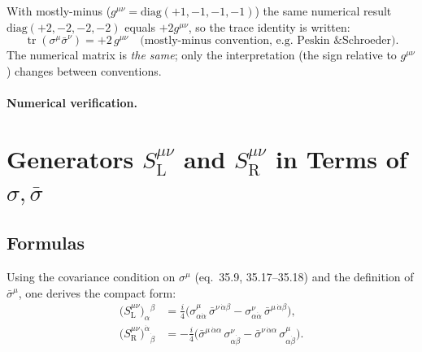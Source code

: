 \begin{metricnote}
With mostly-minus ($g^{\mu\nu}=\mathrm{diag}(+1,-1,-1,-1)$) the same
numerical result $\mathrm{diag}(+2,-2,-2,-2)$ equals $+2g^{\mu\nu}$,
so the trace identity is written:
\[
  \operatorname{tr}(\sigma^\mu\bar\sigma^\nu) = +2\,g^{\mu\nu}
  \quad\text{(mostly-minus convention, e.g.\ Peskin \& Schroeder).}
\]
The numerical matrix is \emph{the same}; only the interpretation (the
sign relative to $g^{\mu\nu}$) changes between conventions.
\end{metricnote}

\paragraph{Numerical verification.}


\section{Generators \texorpdfstring{$S^{\mu\nu}_{\mathrm{L}}$}{S\_L} and
         \texorpdfstring{$S^{\mu\nu}_{\mathrm{R}}$}{S\_R}
         in Terms of \texorpdfstring{$\sigma,\bar\sigma$}{sigma,sigmabar}
         \quad [eq.~35.21--35.22]}

\subsection{Formulas}

Using the covariance condition on $\sigma^\mu$ (eq.~35.9, 35.17--35.18)
and the definition of $\bar\sigma^\mu$, one derives the compact form:
\begin{align}
  \bigl(S^{\mu\nu}_{\mathrm{L}}\bigr)_\alpha{}^\beta
  &= \tfrac{i}{4}
    \bigl(\sigma^\mu_{\alpha\dot\alpha}\,\bar\sigma^{\nu\,\dot\alpha\beta}
         -\sigma^\nu_{\alpha\dot\alpha}\,\bar\sigma^{\mu\,\dot\alpha\beta}\bigr),
  \tag{35.21}\\[6pt]
  \bigl(S^{\mu\nu}_{\mathrm{R}}\bigr)^{\dot\alpha}{}_{\dot\beta}
  &= -\tfrac{i}{4}
    \bigl(\bar\sigma^{\mu\,\dot\alpha\alpha}\,\sigma^\nu_{\alpha\dot\beta}
         -\bar\sigma^{\nu\,\dot\alpha\alpha}\,\sigma^\mu_{\alpha\dot\beta}\bigr).
  \tag{35.22}
\end{align}

